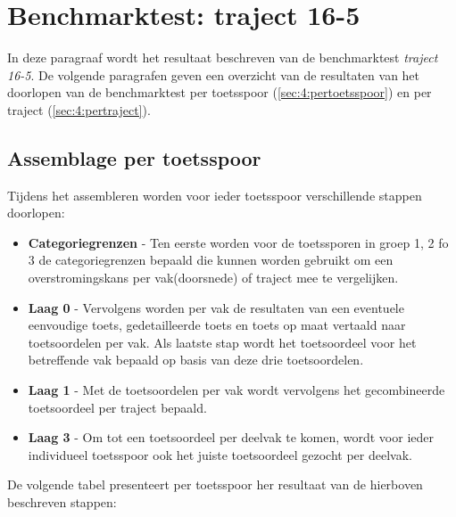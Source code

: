 \section{Benchmarktest: traject 16-5}
	\label{ch:benchmarktTest4}
In deze paragraaf wordt het resultaat beschreven van de benchmarktest \textit{traject 16-5}. De volgende paragrafen geven een overzicht van de resultaten van het doorlopen van de benchmarktest per toetsspoor (\autoref{sec:4:pertoetsspoor}) en per traject (\autoref{sec:4:pertraject}).

\subsection{Assemblage per toetsspoor}
	\label{sec:4:pertoetsspoor}
Tijdens het assembleren worden voor ieder toetsspoor verschillende stappen doorlopen:
\begin{itemize}
	\item \textbf{Categoriegrenzen} - Ten eerste worden voor de toetssporen in groep 1, 2 fo 3 de categoriegrenzen bepaald die kunnen worden gebruikt om een overstromingskans per vak(doorsnede) of traject mee te vergelijken.
	\item \textbf{Laag 0} - Vervolgens worden per vak de resultaten van een eventuele eenvoudige toets, gedetailleerde toets en toets op maat vertaald naar toetsoordelen per vak. Als laatste stap wordt het toetsoordeel voor het betreffende vak bepaald op basis van deze drie toetsoordelen.
	\item \textbf{Laag 1} - Met de toetsoordelen per vak wordt vervolgens het gecombineerde toetsoordeel per traject bepaald.
	\item \textbf{Laag 3} - Om tot een toetsoordeel per deelvak te komen, wordt voor ieder individueel toetsspoor ook het juiste toetsoordeel gezocht per deelvak.
\end{itemize}

De volgende tabel presenteert per toetsspoor her resultaat van de hierboven beschreven stappen:

